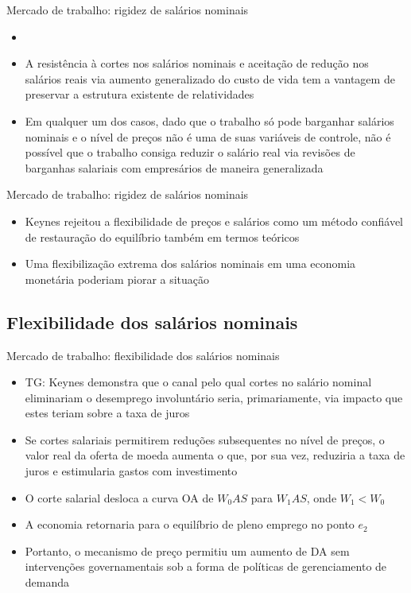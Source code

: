 \documentclass[10pt]{beamer}
\begin{document}
\begin{frame}{Mercado de trabalho: rigidez de salários nominais}
    \begin{itemize}
        \item {}
        \bigskip
        \item A resistência à cortes nos salários nominais e aceitação de redução nos salários reais via aumento generalizado do custo de vida tem a vantagem de preservar a estrutura existente de relatividades
        \bigskip
        \item Em qualquer um dos casos, dado que o trabalho só pode barganhar salários nominais e o nível de preços não é uma de suas variáveis de controle, não é possível que o trabalho consiga reduzir o salário real via revisões de barganhas salariais com empresários de maneira generalizada
    \end{itemize}
\end{frame}

\begin{frame}{Mercado de trabalho: rigidez de salários nominais}
    \begin{itemize}
        \item Keynes rejeitou a flexibilidade de preços e salários como um método confiável de restauração do equilíbrio também em termos teóricos
        \bigskip
        \item Uma flexibilização extrema dos salários nominais em uma economia monetária poderiam piorar a situação
    \end{itemize}
\end{frame}

\subsection{Flexibilidade dos salários nominais}
\begin{frame}{Mercado de trabalho: flexibilidade dos salários nominais}
    \begin{itemize}
        \item TG: Keynes demonstra que o canal pelo qual cortes no salário nominal eliminariam o desemprego involuntário seria, primariamente, via impacto que estes teriam sobre a taxa de juros
        \bigskip
        \item Se cortes salariais permitirem reduções subsequentes no nível de preços, o valor real da oferta de moeda aumenta o que, por sua vez, reduziria a taxa de juros e estimularia gastos com investimento
        \bigskip
        \item O corte salarial desloca a curva OA de $W_0AS$ para $W_1AS$, onde $W_1 < W_0$
        \bigskip
        \item A economia retornaria para o equilíbrio de pleno emprego no ponto $e_2$
        \bigskip
        \item Portanto, o mecanismo de preço permitiu um aumento de DA sem intervenções governamentais sob a forma de políticas de gerenciamento de demanda
    \end{itemize}
\end{frame}
\end{document}
